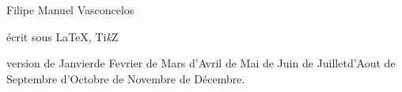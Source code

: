 \vspace*{1cm}
\mbox{}\hfill{}

{\vspace*{3cm}\centerline{\Huge Filipe Manuel Vasconcelos}}

{\small\hbox{}\vfill
\hfill écrit sous \LaTeX, Ti\emph{k}Z

\renewcommand{\today}{\ifcase\month\or de Janvier\or de Fevrier \or de Mars
                                   \or d'Avril   \or de Mai     \or de Juin
                                   \or de Juillet\or d'Aout     \or de Septembre
                                   \or d'Octobre \or de Novembre\or 
                                       de Décembre\fi\number \year}
\hfill version \today.

\hfill 
\doclicenseLongText

\hfill 
\doclicenseImage[imagewidth=10em]
}
